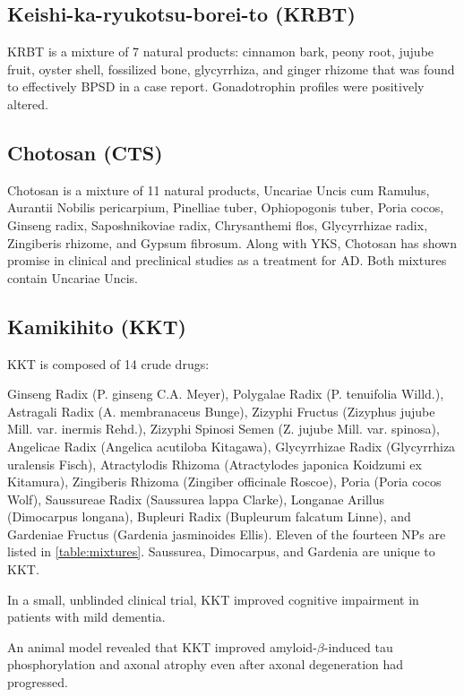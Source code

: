 \subsection{Keishi-ka-ryukotsu-borei-to (KRBT)}

KRBT is a mixture of 7 natural products:
cinnamon bark,
peony root,
jujube fruit,
oyster shell,
fossilized bone,
glycyrrhiza,
and ginger rhizome
that was found to effectively BPSD in a case report.
Gonadotrophin profiles were positively altered.
\cite{niitsu2013behavioural}




\subsection{Chotosan (CTS)}
Chotosan is a mixture of 11 natural products,
Uncariae Uncis cum Ramulus,
Aurantii Nobilis pericarpium,
Pinelliae tuber,
Ophiopogonis tuber,
Poria cocos,
Ginseng radix,
Saposhnikoviae radix,
Chrysanthemi flos,
Glycyrrhizae radix,
Zingiberis rhizome,
and Gypsum fibrosum.
Along with YKS, Chotosan has shown promise in clinical and
preclinical studies as a treatment for AD.
Both mixtures contain Uncariae Uncis.
\cite{matsumoto2013kampo}



\subsection{Kamikihito (KKT)}
KKT is composed of 14 crude drugs:

Ginseng Radix (P. ginseng C.A. Meyer),
Polygalae Radix (P. tenuifolia Willd.),
Astragali Radix (A. membranaceus Bunge),
Zizyphi Fructus (Zizyphus jujube Mill. var. inermis Rehd.),
Zizyphi Spinosi Semen (Z. jujube Mill. var. spinosa),
Angelicae Radix (Angelica acutiloba Kitagawa),
Glycyrrhizae Radix (Glycyrrhiza uralensis Fisch),
Atractylodis Rhizoma (Atractylodes japonica Koidzumi ex Kitamura),
Zingiberis Rhizoma (Zingiber officinale Roscoe),
Poria (Poria cocos Wolf),
Saussureae Radix (Saussurea lappa Clarke),
Longanae Arillus (Dimocarpus longana),
Bupleuri Radix (Bupleurum falcatum Linne), and
Gardeniae Fructus (Gardenia jasminoides Ellis).
Eleven of the fourteen NPs are listed in \ref{table:mixtures}.
Saussurea, Dimocarpus, and Gardenia are unique to KKT.

In a small, unblinded clinical trial, KKT improved cognitive impairment in
patients with mild dementia.
\cite{arai2015effectiveness}

An animal model revealed that KKT
improved amyloid-$\beta$-induced tau phosphorylation and axonal atrophy
even after axonal degeneration had progressed.
\cite{watari2014new, watari2015comparing}

